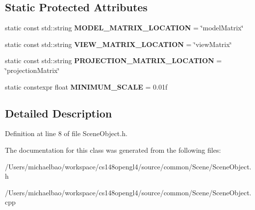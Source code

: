 \subsection*{Static Protected Attributes}
\begin{DoxyCompactItemize}
\item 
\hypertarget{class_scene_object_a62d236f4f5c52b66bd02d13d09b6ce5e}{}static const std\+::string {\bfseries M\+O\+D\+E\+L\+\_\+\+M\+A\+T\+R\+I\+X\+\_\+\+L\+O\+C\+A\+T\+I\+O\+N} = \char`\"{}model\+Matrix\char`\"{}\label{class_scene_object_a62d236f4f5c52b66bd02d13d09b6ce5e}

\item 
\hypertarget{class_scene_object_a1c129ecdd6bd8e2f34c713f5dd183361}{}static const std\+::string {\bfseries V\+I\+E\+W\+\_\+\+M\+A\+T\+R\+I\+X\+\_\+\+L\+O\+C\+A\+T\+I\+O\+N} = \char`\"{}view\+Matrix\char`\"{}\label{class_scene_object_a1c129ecdd6bd8e2f34c713f5dd183361}

\item 
\hypertarget{class_scene_object_ad9a8c9c39a4a262c5e379c0bda184541}{}static const std\+::string {\bfseries P\+R\+O\+J\+E\+C\+T\+I\+O\+N\+\_\+\+M\+A\+T\+R\+I\+X\+\_\+\+L\+O\+C\+A\+T\+I\+O\+N} = \char`\"{}projection\+Matrix\char`\"{}\label{class_scene_object_ad9a8c9c39a4a262c5e379c0bda184541}

\item 
\hypertarget{class_scene_object_a5c61f60925abade4340e7e56c68a989a}{}static constexpr float {\bfseries M\+I\+N\+I\+M\+U\+M\+\_\+\+S\+C\+A\+L\+E} = 0.\+01f\label{class_scene_object_a5c61f60925abade4340e7e56c68a989a}

\end{DoxyCompactItemize}


\subsection{Detailed Description}


Definition at line 8 of file Scene\+Object.\+h.



The documentation for this class was generated from the following files\+:\begin{DoxyCompactItemize}
\item 
/\+Users/michaelbao/workspace/cs148opengl4/source/common/\+Scene/Scene\+Object.\+h\item 
/\+Users/michaelbao/workspace/cs148opengl4/source/common/\+Scene/Scene\+Object.\+cpp\end{DoxyCompactItemize}
